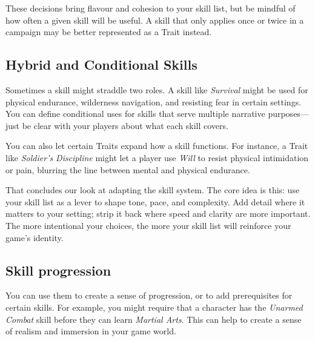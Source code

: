 These decisions bring flavour and cohesion to your skill list, but be mindful of how often a given skill will be useful. A skill that only applies once or twice in a campaign may be better represented as a Trait instead.

\subsection{Hybrid and Conditional Skills}
Sometimes a skill might straddle two roles. A skill like \textit{Survival} might be used for physical endurance, wilderness navigation, and resisting fear in certain settings. You can define conditional uses for skills that serve multiple narrative purposes—just be clear with your players about what each skill covers.

You can also let certain Traits expand how a skill functions. For instance, a Trait like \textit{Soldier’s Discipline} might let a player use \textit{Will} to resist physical intimidation or pain, blurring the line between mental and physical endurance.

\vspace{1\baselineskip}
That concludes our look at adapting the skill system. The core idea is this: use your skill list as a lever to shape tone, pace, and complexity. Add detail where it matters to your setting; strip it back where speed and clarity are more important. The more intentional your choices, the more your skill list will reinforce your game’s identity.


\subsection{Skill progression}\label{toolbox:skill-progress}

You can use them to create a sense of progression, or to add prerequisites for certain skills. For example, you might require that a character has the \textit{Unarmed Combat} skill before they can learn \textit{Martial Arts}. This can help to create a sense of realism and immersion in your game world.
